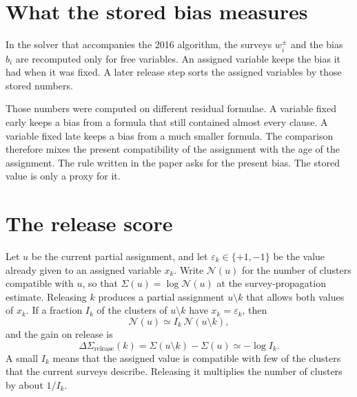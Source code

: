 \documentclass[11pt]{article}
\begin{document}
\section{What the stored bias measures}

In the solver that accompanies the 2016 algorithm, the surveys $w^{\pm}_i$ and the bias $b_i$ are recomputed only for free variables. An assigned variable keeps the bias it had when it was fixed. A later release step sorts the assigned variables by those stored numbers.

Those numbers were computed on different residual formulae. A variable fixed early keeps a bias from a formula that still contained almost every clause. A variable fixed late keeps a bias from a much smaller formula. The comparison therefore mixes the present compatibility of the assignment with the age of the assignment. The rule written in the paper asks for the present bias. The stored value is only a proxy for it.

\section{The release score}

Let $u$ be the current partial assignment, and let $\varepsilon_k\in\{+1,-1\}$ be the value already given to an assigned variable $x_k$. Write $\mathcal N(u)$ for the number of clusters compatible with $u$, so that $\Sigma(u)=\log\mathcal N(u)$ at the survey-propagation estimate. Releasing $k$ produces a partial assignment $u\setminus k$ that allows both values of $x_k$. If a fraction $I_k$ of the clusters of $u\setminus k$ have $x_k=\varepsilon_k$, then
\begin{equation}
\mathcal N(u)
\simeq
I_k\,\mathcal N(u\setminus k),
\label{eq:Ik-def}
\end{equation}
and the gain on release is
\begin{equation}
\Delta\Sigma_{\mathrm{release}}(k)
=
\Sigma(u\setminus k)-\Sigma(u)
\simeq
-\log I_k.
\label{eq:dS}
\end{equation}
A small $I_k$ means that the assigned value is compatible with few of the clusters that the current surveys describe. Releasing it multiplies the number of clusters by about $1/I_k$.
\end{document}
